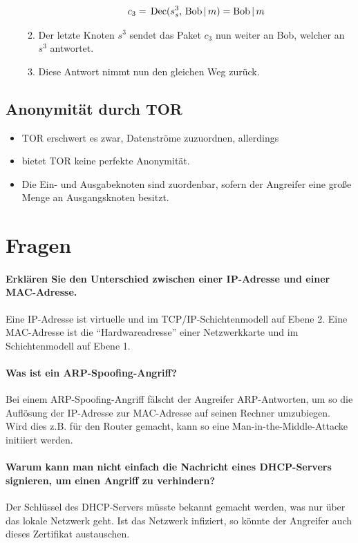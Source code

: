\begin{itemize}
\begin{enumerate}
\begin{align*}
							c_3 & =\, \operatorname{Dec}(s^3_s,\, \text{Bob} \,\vert\, m) = \text{Bob} \,\vert\, m                                                                                                                     \\
						\end{align*}
					\item Der letzte Knoten \(s^3\) sendet das Paket \(c_3\) nun weiter an Bob, welcher an \(s^3\) antwortet.
					\item Diese Antwort nimmt nun den gleichen Weg zurück.
				\end{enumerate}
		\end{itemize}

	\subsection{Anonymität durch TOR}
		\begin{itemize}
			\item TOR erschwert es zwar, Datenströme zuzuordnen, allerdings
			\item bietet TOR keine perfekte Anonymität.
			\item Die Ein- und Ausgabeknoten sind zuordenbar, sofern der Angreifer eine große Menge an Ausgangsknoten besitzt.
		\end{itemize}

\section{Fragen}
\paragraph{Erklären Sie den Unterschied zwischen einer IP-Adresse und einer MAC-Adresse.}
Eine IP-Adresse ist virtuelle und im TCP/IP-Schichtenmodell auf Ebene 2. Eine MAC-Adresse ist die \enquote{Hardwareadresse} einer Netzwerkkarte und im Schichtenmodell auf Ebene 1.

\paragraph{Was ist ein ARP-Spoofing-Angriff?}
Bei einem ARP-Spoofing-Angriff fälscht der Angreifer ARP-Antworten, um so die Auflösung der IP-Adresse zur MAC-Adresse auf seinen Rechner umzubiegen. Wird dies z.B. für den Router gemacht, kann so eine Man-in-the-Middle-Attacke initiiert werden.

\paragraph{Warum kann man nicht einfach die Nachricht eines DHCP-Servers signieren, um einen Angriff zu verhindern?}
Der Schlüssel des DHCP-Servers müsste bekannt gemacht werden, was nur über das lokale Netzwerk geht. Ist das Netzwerk infiziert, so könnte der Angreifer auch dieses Zertifikat austauschen.

